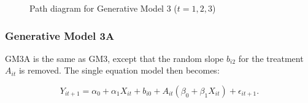 \documentclass[
  12pt,
  a4paper,
]{article}
\begin{document}
\begin{figure}[H]

\caption{\label{fig-GM3_path}Path diagram for Generative Model 3
(\(t = 1, 2, 3\))}


\end{figure}%

\subsubsection{Generative Model 3A}\label{generative-model-3a}

GM3A is the same as GM3, except that the random slope \(b_{i2}\) for the
treatment \(A_{it}\) is removed. The single equation model then becomes:

\[
Y_{it+1} = \alpha_0 + \alpha_1 X_{it} + b_{i0} + A_{it} (\beta_0 + \beta_1 X_{it}) + \epsilon_{it+1}.
\]
\end{document}
